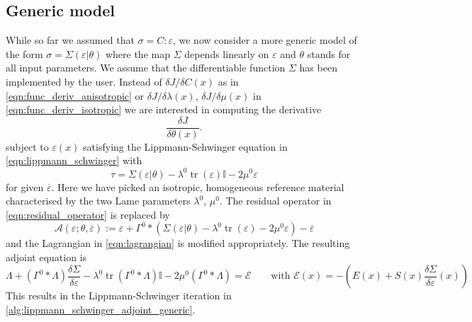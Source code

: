 \documentclass[11pt]{article}
\begin{document}
\subsection{Generic model}
While so far we assumed that $\sigma=C:\varepsilon$, we now consider a more generic model of the form $\sigma=\Sigma(\varepsilon|\theta)$ where the map $\Sigma$ depends linearly on $\varepsilon$ and $\theta$ stands for all input parameters. We assume that the differentiable function $\Sigma$ has been implemented by the user. Instead of $\delta J/\delta C(x)$ as in \eqref{eqn:func_deriv_anisotropic} or $\delta J/\delta \lambda(x)$, $\delta J/\delta \mu(x)$ in \eqref{eqn:func_deriv_isotropic} we are interested in computing the derivative
\begin{equation}
\frac{\delta J}{\delta \theta(x)}.
\end{equation}
subject to $\varepsilon(x)$ satisfying the Lippmann-Schwinger equation in \eqref{eqn:lippmann_schwinger} with
\begin{equation}
\tau = \Sigma(\varepsilon|\theta) - \lambda^0 \operatorname{tr}(\varepsilon)\mathbb{I}-2\mu^0\varepsilon\label{eqn:tau_generic}
\end{equation}
for given $\overline{\varepsilon}$. Here we have picked an isotropic, homogeneous reference material characterised by the two Lame parameters $\lambda^0$, $\mu^0$. The residual operator in \eqref{eqn:residual_operator} is replaced by
\begin{equation}
    \mathcal{A}(\varepsilon;\theta,\overline{\varepsilon}) := \varepsilon + \Gamma^0 * \left(\Sigma(\varepsilon|\theta) - \lambda^0 \operatorname{tr}(\varepsilon)-2\mu^0\varepsilon\right) - \overline{\varepsilon}\label{eqn:residual_operator}
\end{equation}
and the Lagrangian in \eqref{eqn:lagrangian} is modified appropriately. The resulting adjoint equation is
\begin{equation}
\Lambda + (\Gamma^0*\Lambda)\frac{\delta \Sigma}{\delta \varepsilon} - \lambda^0 \operatorname{tr}(\Gamma^0*\Lambda)\mathbb{I} - 2\mu^0 (\Gamma^0*\Lambda) = \mathcal{E} 
\qquad\text{with $\mathcal{E}(x) = -\left(E(x) + S(x)\frac{\delta \Sigma}{\delta \varepsilon}(x)\right)$}
\end{equation}
This results in the Lippmann-Schwinger iteration in \cref{alg:lippmann_schwinger_adjoint_generic}.
\end{document}

